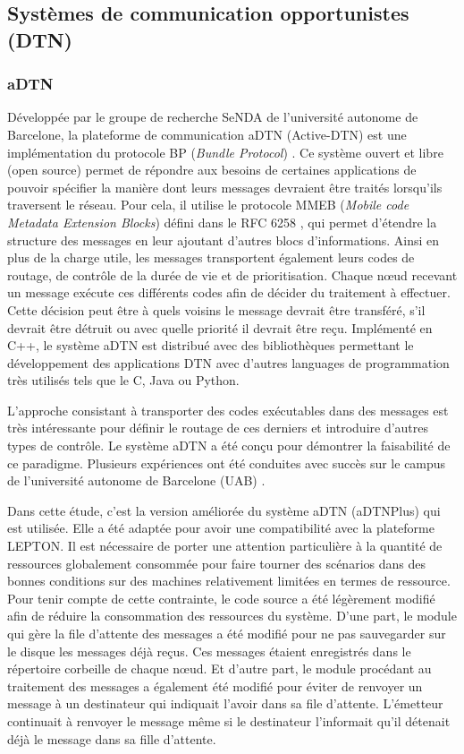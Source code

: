 \documentclass[a4paper,10pt]{article}
\begin{document}
\subsection{Systèmes de communication opportunistes (DTN)}

\subsubsection{aDTN}
Développée par le groupe de recherche SeNDA de l'université autonome de Barcelone, la plateforme de communication aDTN (Active-DTN) est une implémentation du protocole BP (\textit{Bundle Protocol}) \cite{rfc5050}. Ce système ouvert et libre (open source) permet de répondre aux besoins de certaines applications de pouvoir spécifier la manière dont leurs messages devraient être traités lorsqu'ils traversent le réseau. Pour cela, il utilise le protocole MMEB (\textit{Mobile code Metadata Extension Blocks}) défini dans le RFC 6258 \cite{rfc6258}, qui permet d'étendre la structure des messages en leur ajoutant d'autres blocs d'informations. Ainsi en plus de la charge utile, les messages transportent également leurs codes de routage, de contrôle de la durée de vie et de prioritisation. Chaque nœud recevant un message exécute ces différents codes afin de décider du traitement à effectuer. Cette décision peut être à quels voisins le message devrait être transféré, s'il devrait être détruit ou avec quelle priorité il devrait être reçu. Implémenté en C++, le système aDTN est distribué avec des bibliothèques permettant le développement des applications DTN avec d'autres languages de programmation très utilisés tels que le C, Java ou Python. \par

L'approche consistant à transporter des codes exécutables dans des messages est très intéressante pour définir le routage de ces derniers et introduire d'autres types de contrôle. Le système aDTN a été conçu pour démontrer la faisabilité de ce paradigme. Plusieurs expériences ont été conduites avec succès sur le campus de l'université autonome de Barcelone (UAB) \cite{lepton18}. \par

Dans cette étude, c'est la version améliorée du système aDTN (aDTNPlus) qui est utilisée. Elle a été adaptée pour avoir une compatibilité avec la plateforme LEPTON. Il est nécessaire de porter une attention particulière à la quantité de ressources globalement consommée pour faire tourner des scénarios dans des bonnes conditions sur des machines relativement limitées en termes de ressource. Pour tenir compte de cette contrainte, le code source a été légèrement modifié afin de réduire la consommation des ressources du système. D'une part, le module qui gère la file d'attente des messages a été modifié pour ne pas sauvegarder sur le disque les messages déjà reçus. Ces messages étaient enregistrés dans le répertoire corbeille de chaque nœud. Et d'autre part, le module procédant au traitement des messages a également été modifié pour éviter de renvoyer un message à un destinateur qui indiquait l'avoir dans sa file d'attente. L'émetteur continuait à renvoyer le message même si le destinateur l'informait qu'il détenait déjà le message dans sa fille d'attente.
\end{document}
